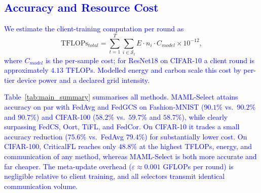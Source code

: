 \documentclass[journal]{IEEEtran}
\newcommand{\revision}[1]{\textcolor{blue}{#1}}
\begin{document}
\subsection{\revision{Accuracy and Resource Cost}}
\revision{We estimate the client-training computation per round as}
\begin{equation}
	\text{TFLOPs}_{total} = \sum_{t=1}^{T} \sum_{i \in \mathcal{S}_t} E \cdot n_i \cdot C_{model} \times 10^{-12},
	\label{eq:tflops}
\end{equation}
\revision{where $C_{model}$ is the per-sample cost; for ResNet18 on CIFAR-10 a client round is approximately $4.13$ TFLOPs. Modelled energy and carbon scale this cost by per-tier device power and a declared grid intensity.}

\revision{Table~\ref{tab:main_summary} summarises all methods. MAML-Select attains accuracy on par with FedAvg and FedGCS on Fashion-MNIST ($90.1\%$ vs.\ $90.2\%$ and $90.7\%$) and CIFAR-100 ($58.2\%$ vs.\ $59.7\%$ and $58.7\%$), while clearly surpassing FedCS, Oort, TiFL, and FedCor. On CIFAR-10 it trades a small accuracy reduction ($75.6\%$ vs.\ FedAvg $79.4\%$) for substantially lower cost. On CIFAR-100, CriticalFL reaches only $48.8\%$ at the highest TFLOPs, energy, and communication of any method, whereas MAML-Select is both more accurate and far cheaper. The meta-update overhead ($\varepsilon \approx 0.001$ GFLOPs per round) is negligible relative to client training, and all selectors transmit identical communication volume.}
\end{document}
